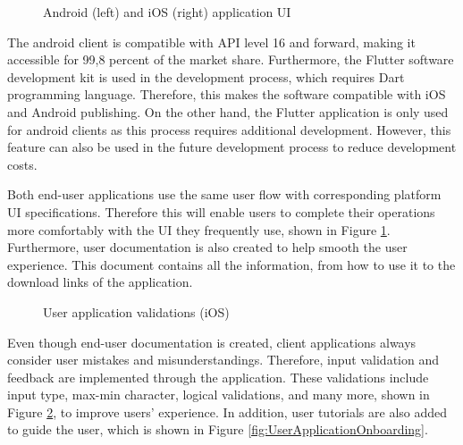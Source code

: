 \begin{figure}[htbp]
\centering
{}
\caption{Android (left) and iOS (right) application UI}
\label{fig:UserApplicationUI}
\end{figure}

The android client is compatible with API level 16 and forward, making it accessible for 99,8 percent of the market share. Furthermore, the Flutter software development kit is used in the development process, which requires Dart programming language. Therefore, this makes the software compatible with iOS and Android publishing. On the other hand, the Flutter application is only used for android clients as this process requires additional development. However, this feature can also be used in the future development process to reduce development costs.

Both end-user applications use the same user flow with corresponding platform UI specifications. Therefore this will enable users to complete their operations more comfortably with the UI they frequently use, shown in Figure \ref{fig:UserApplicationUI}. Furthermore, user documentation is also created to help smooth the user experience. This document contains all the information, from how to use it to the download links of the application. 

\begin{figure}[htbp]
\centering
{}
\caption{User application validations (iOS)}
\label{fig:UserApplicationValidations}
\end{figure}

Even though end-user documentation is created, client applications always consider user mistakes and misunderstandings. Therefore, input validation and feedback are implemented through the application. These validations include input type, max-min character, logical validations, and many more, shown in Figure \ref{fig:UserApplicationValidations}, to improve users' experience. In addition, user tutorials are also added to guide the user, which is shown in Figure \ref{fig:UserApplicationOnboarding}.

